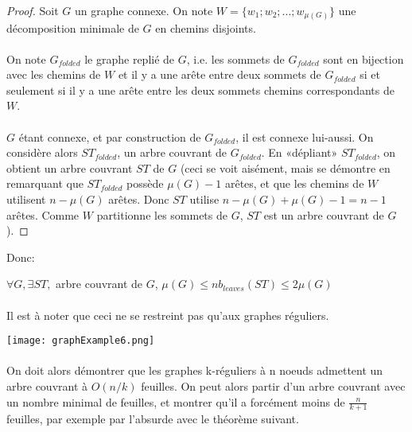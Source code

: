 \documentclass[a4paper]{article}
\theoremstyle{definition}
\theoremstyle{remark}
\begin{document}
\begin{proof}
Soit $G$ un graphe connexe. On note $W= \{ w_{1};w_{2};...;w_{\mu(G)} \}$ une décomposition minimale de $G$ en chemins disjoints.

\paragraph{}
On note $G_{folded}$ le graphe replié de $G$, i.e. les sommets de $G_{folded}$ sont en bijection avec les chemins de $W$ et il y a une arête entre deux sommets de $G_{folded}$ si et seulement si il y a une arête
entre les deux sommets chemins correspondants de $W$.

\paragraph{}
$G$ étant connexe, et par construction de $G_{folded}$, il est connexe 
lui-aussi. On considère alors $ST_{folded}$, un arbre couvrant de $G_{folded}$. En «dépliant» $ST_{folded}$, on obtient un arbre couvrant $ST$ de $G$ (ceci se voit aisément, mais se démontre en remarquant que $ST_{folded}$ possède $\mu(G)-1$ arêtes, et que les chemins de $W$ utilisent $n - \mu(G)$ arêtes. Donc $ST$ utilise $n - \mu(G) + \mu(G)-1 = n-1$ arêtes. Comme $W$ partitionne les sommets de $G$, $ST$ est un arbre couvrant de $G$).
\end{proof}

Donc:

$\forall G, \exists ST,$ arbre couvrant de $G$, $ \mu(G) \leq nb_{leaves}(ST) \leq 2\mu(G)$

\paragraph{}
Il est à noter que ceci ne se restreint pas qu'aux graphes réguliers.

\texttt{[image: graphExample6.png]}

\paragraph{}
On doit alors démontrer que les graphes k-réguliers à n noeuds admettent
un arbre couvrant à $O(n/k)$ feuilles. On peut alors partir d'un arbre
couvrant avec un nombre minimal de feuilles, et montrer qu'il a forcément moins de $\frac{n}{k+1}$ feuilles, par exemple par l'absurde 
avec le théorème suivant.
\end{document}
